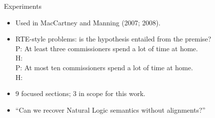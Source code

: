 
\begin{frame}{Experiments}
\begin{itemize}
  \item Used in MacCartney and Manning (2007; 2008).
  \item RTE-style problems: is the hypothesis entailed from the premise? \\
  \pause
    \vspace{0.1cm}
    P: At least three commissioners spend a lot of time at home. \\
    H:  \\
    \vspace{0.1cm}
    \pause
    P: At most ten commissioners spend a lot of time at home. \\
    H: 
    \vspace{0.1cm}
  \pause
  \item 9 focused sections; 3 in scope for this work.
\end{itemize}
\vspace{0.5cm}
\pause

\begin{itemize}
  \item ``Can we recover Natural Logic semantics without alignments?''
\end{itemize}
\end{frame}

